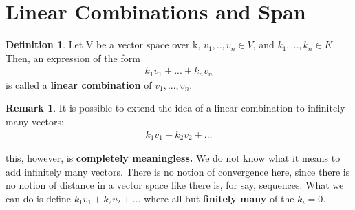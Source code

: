 \documentclass[a4paper, 12pt]{article}
\theoremstyle{definition}
\theoremstyle{definition}
\newtheorem{defn}{Definition}[section]
\theoremstyle{definition}
\theoremstyle{definition}
\newtheorem{rmk}{Remark}[section]
\begin{document}
{\section{Linear Combinations and Span}
\begin{defn}
	Let V be a vector space over k, $v_1,.., v_n \in V$, and $k_1,...,k_n \in K$. Then, an expression of the form 
	\begin{align*}
		k_1 v_1 + ... + k_n v_n
	\end{align*}
	is called a \textbf{linear combination} of $v_1, ..., v_n$. 
\end{defn}
\begin{rmk}
	It is possible to extend the idea of a linear combination to infinitely many vectors: 
	\begin{align*}
		k_1v_1 + k_2v_2 + ...
	\end{align*}
\end{rmk}
this, however, is \textbf{completely meaningless.} We do not know what it means to add infinitely many vectors. There is no notion of convergence here, since there is no notion of distance in a vector space like there is, for say, sequences. 
\newline 
\newline
What we can do is define $k_1 v_1 + k_2 v_2 + ... $ where all but \textbf{finitely many} of the $k_i = 0$. 

}
\end{document}

